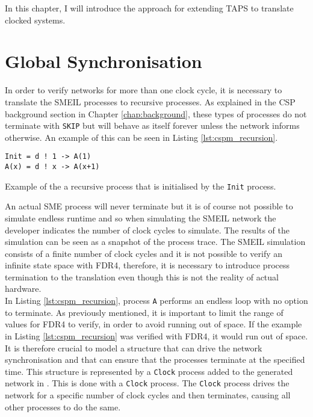 In this chapter, I will introduce the approach for extending TAPS to translate clocked systems.
\section{Global Synchronisation}
In order to verify networks for more than one clock cycle, it is necessary to translate the SMEIL processes to recursive \cspm{} processes. As explained in the CSP background section in Chapter \ref{chap:background}, these types of processes do not terminate with \texttt{SKIP} but will behave as itself forever unless the network informs otherwise.
An example of this can be seen in Listing \ref{lst:cspm_recursion}.
\begin{listing}
\begin{verbatim}
Init = d ! 1 -> A(1)
A(x) = d ! x -> A(x+1)
\end{verbatim}
\caption{Example of the a recursive \cspm{} process that is initialised by the \texttt{Init} process.}
\label{lst:cspm_recursion}
\end{listing}

An actual SME process will never terminate but it is of course not possible to simulate endless runtime and so when simulating the SMEIL network the developer indicates the number of clock cycles to simulate. The results of the simulation can be seen as a snapshot of the process trace. The SMEIL simulation consists of a finite number of clock cycles and it is not possible to verify an infinite state space with FDR4, therefore, it is necessary to introduce process termination to the translation even though this is not the reality of actual hardware. \\

In Listing \ref{lst:cspm_recursion}, process \texttt{A} performs an endless loop with no option to terminate. As previously mentioned, it is important to limit the range of values for FDR4 to verify, in order to avoid running out of space. If the example in Listing \ref{lst:cspm_recursion} was verified with FDR4, it would run out of space. It is therefore crucial to model a structure that can drive the network synchronisation and that can ensure that the processes terminate at the specified time. This structure is represented by a \texttt{Clock} process added to the generated network in \cspm{}.
This is done with a \texttt{Clock} process. The \texttt{Clock} process drives the network for a specific number of clock cycles and then terminates, causing all other processes to do the same. \\


